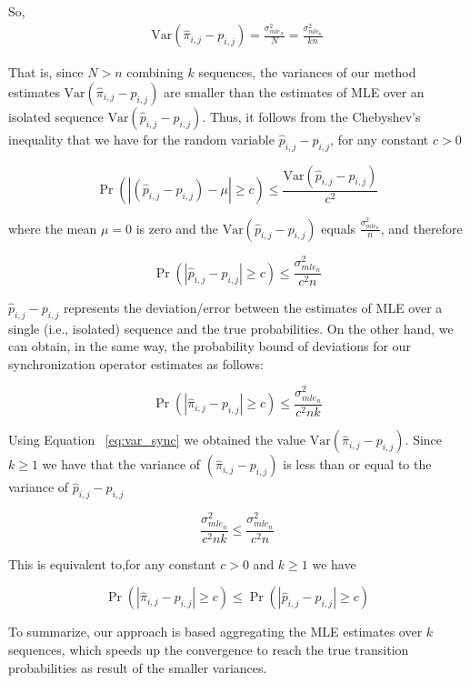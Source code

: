 So, 
\begin{equation}
\begin{aligned}
\label{eq:var_sync}
 \mathrm{Var} (\hat{\pi}_{i,j} - {p}_{i,j}) = \frac {\sigma^{2}_{mle_N}}{N} =  \frac {\sigma^{2}_{mle_n}}{kn}
\end{aligned}
\end{equation}


That is, since $N > n$ combining $k$ sequences, the variances  of our method estimates $\mathrm{Var} (\hat{\pi}_{i,j} - {p}_{i,j})$  are smaller than the estimates of MLE over an isolated sequence $\mathrm{Var} (\hat{p}_{i,j} - {p}_{i,j})$. Thus, it follows from the  Chebyshev's inequality \cite{feller1968introduction} that we have for the random variable $\hat{p}_{i,j} - {p}_{i,j}$, for any constant $c > 0$  

\[ \Pr\left( |(\hat{p}_{i,j} - {p}_{i,j}) - \mu| \geq c \right) \leq
\frac{\mathrm{Var} (\hat{p}_{i,j} - {p}_{i,j})}{c^2} \]


 where the mean $\mu=0$ is zero and the $\mathrm{Var} (\hat{p}_{i,j} - {p}_{i,j})$ equals  $\frac {\sigma^{2}_{mle_n}}{n}$, and therefore 
 
 \[ \Pr\left( |\hat{p}_{i,j} - {p}_{i,j}| \geq c \right) \leq
 \frac{\sigma^{2}_{mle_n}}{c^2 n} \]
 
 
$\hat{p}_{i,j} - {p}_{i,j}$  represents the deviation/error between the estimates of MLE over a single (i.e., isolated) sequence and the true probabilities. On the other hand, we can obtain, in the same way, the probability bound of deviations for our synchronization operator estimates as follows:

\[ \Pr\left( |\hat{\pi}_{i,j} - {p}_{i,j}| \geq c \right) \leq
\frac{\sigma^{2}_{mle_n}}{c^2 nk} \]


Using Equation ~\ref{eq:var_sync} we obtained the value $\mathrm{Var} (\hat{\pi}_{i,j} - {p}_{i,j})$. Since $k \ge 1$ we have that the variance of $(\hat{\pi}_{i,j} - {p}_{i,j})$  is less than or equal to the variance of $\hat{p}_{i,j} - {p}_{i,j}$

\[ 
\frac{\sigma^{2}_{mle_n}}{c^2 nk} \leq
\frac{\sigma^{2}_{mle_n}}{c^2 n}
 \]

This is equivalent to,for any constant $c > 0$ and $k \ge 1$ we have

\[ \Pr\left( |\hat{\pi}_{i,j} - {p}_{i,j}| \geq c \right) \leq
 \Pr\left( |\hat{p}_{i,j} - {p}_{i,j}| \geq c \right)
 \]


To summarize, our approach is based aggregating the MLE estimates over $k$ sequences, which speeds up the convergence to reach the true transition probabilities as result of the  smaller variances.

